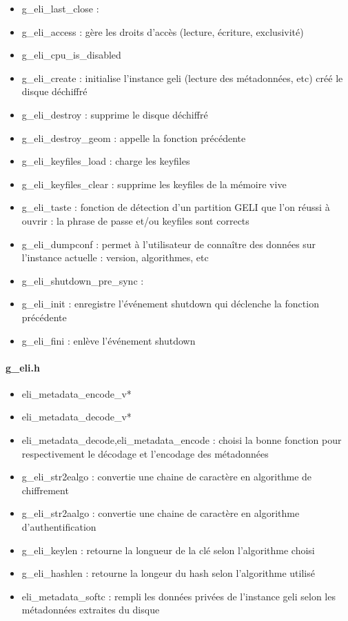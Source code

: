 \begin{itemize}
	\item g\_eli\_last\_close :
	\item g\_eli\_access : gère les droits d'accès (lecture, écriture, exclusivité)
	\item g\_eli\_cpu\_is\_disabled
	\item g\_eli\_create : initialise l'instance geli (lecture des métadonnées, etc)
		créé le disque déchiffré
	\item g\_eli\_destroy : supprime le disque déchiffré
	\item g\_eli\_destroy\_geom : appelle la fonction précédente
	\item g\_eli\_keyfiles\_load : charge les keyfiles
	\item g\_eli\_keyfiles\_clear : supprime les keyfiles de la mémoire vive
	\item g\_eli\_taste : fonction de détection d'un partition GELI que l'on réussi à
		ouvrir : la phrase de passe et/ou keyfiles sont corrects
	\item g\_eli\_dumpconf : permet à l'utilisateur de connaître des données sur 
		l'instance actuelle : version, algorithmes, etc
	\item g\_eli\_shutdown\_pre\_sync : 
	\item g\_eli\_init : enregistre l'événement shutdown qui déclenche la fonction
		précédente
	\item g\_eli\_fini : enlève l'événement shutdown
\end{itemize}

\paragraph{g\_eli.h}
\begin{itemize}
	\item eli\_metadata\_encode\_v*
	\item eli\_metadata\_decode\_v*
	\item eli\_metadata\_decode,eli\_metadata\_encode : choisi la bonne fonction pour 
		respectivement le décodage et l'encodage des métadonnées
	\item g\_eli\_str2ealgo : convertie une chaine de caractère en algorithme de 
		chiffrement
	\item g\_eli\_str2aalgo : convertie une chaine de caractère en algorithme 
		d'authentification
	\item g\_eli\_keylen : retourne la longueur de la clé selon l'algorithme choisi
	\item g\_eli\_hashlen : retourne la longeur du hash selon l'algorithme utilisé
	\item eli\_metadata\_softc : rempli les données privées de l'instance geli 
		selon les métadonnées extraites du disque
\end{itemize}

